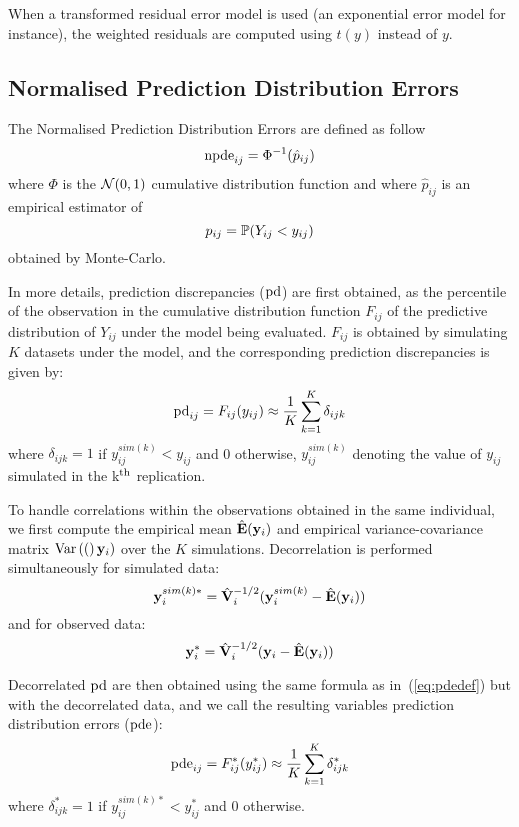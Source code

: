 When a transformed residual error model is used (an exponential error model for instance), the weighted residuals are computed using $t(y)$ instead of $y$.

\subsection{Normalised Prediction Distribution Errors}

The Normalised Prediction Distribution Errors are defined as follow
$${\rm npde}_{ij}=\Phi^{-1}(\hat{p}_{ij})$$
where $\Phi$ is the $\mbox{$\mathcal{N}$}(0,1)$ cumulative distribution function and where $\hat{p}_{ij}$ is an empirical estimator of
$$p_{ij} = \mathbb{P}\!\left(Y_{ij}<y_{ij}\right)$$
obtained by Monte-Carlo. 

In more details, prediction discrepancies (${\rm pd}$) are first obtained, as the percentile of the observation in the cumulative distribution function $F_{ij}$ of the predictive distribution of $Y_{ij}$ under the model being evaluated. $F_{ij}$ is obtained by simulating $K$ datasets under the model, and the corresponding prediction discrepancies is given by:
\begin{equation}
{\rm pd}_{ij} = F_{ij}(y_{ij}) \approx \frac{1}{K} \sum_{k=1}^K \delta_{ijk} \label{eq:pdedef}
\end{equation}
where $\delta_{ijk}=1$ if $y_{ij}^{sim(k)} < y_{ij}$ and 0 otherwise, $y_{ij}^{sim(k)}$ denoting the value of $y_{ij}$ simulated in the k$^{\rm th}$ replication.

To handle correlations within the observations obtained in the same individual, we first compute the empirical mean $\hat{{\mathbf{E}}}({\mathbf{y}}_i)$ and empirical variance-covariance matrix $\mbox{Var}\left((\right){\mathbf{y}}_i)$ over the $K$ simulations. Decorrelation is performed simultaneously for simulated data:
\begin{equation}
{\mathbf{y}}_{i}^{sim(k)*}= \hat{{\mathbf{V}}}_i^{-1/2} ({\mathbf{y}}_{i}^{sim(k)}-\hat{{\mathbf{E}}}({\mathbf{y}}_i)) \label{eq:decorrsim}
\end{equation}
and for observed data:
\begin{equation}
{\mathbf{y}}_{i}^*= \hat{{\mathbf{V}}}_i^{-1/2} ({\mathbf{y}}_{i}-\hat{{\mathbf{E}}}({\mathbf{y}}_i)) \label{eq:decorrobs}
\end{equation}

Decorrelated ${\rm pd}$ are then obtained using the same formula as in~(\ref{eq:pdedef}) but with the decorrelated data, and we call the resulting variables prediction distribution errors (${\rm pde}$):
\begin{equation}
{\rm pde}_{ij} = F^*_{ij}(y^*_{ij}) \approx \frac{1}{K} \sum_{k=1}^K \delta_{ijk}^*
\end{equation}
where $\delta_{ijk}^*=1$ if $y_{ij}^{sim(k)*} < y_{ij}^*$ and 0 otherwise.

